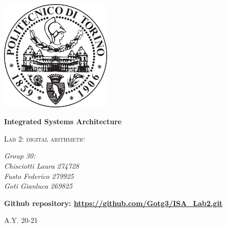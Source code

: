 \documentclass[a4paper, titlepage]{article}
\begin{document}
\begin{titlepage}
	\centering
	\includegraphics[width=0.40\textwidth]{Politecnico_di_Torino_-_Logo}\par\vspace{1cm}
	\vspace{1cm}
	{\huge\bfseries Integrated Systems Architecture\par}
	\vspace{1cm}
	{\scshape\Large Lab 2: digital arithmetic \par}
	\vspace{2,5cm}
	{\Large\itshape Group 30:\\Chisciotti Laura 274728\\Fusto Federico 279925 \\Goti Gianluca 269825\par}
	\vspace{2,5cm}
		{\Large\bfseries Github repository: \url{https://github.com/Gotg3/ISA_Lab2.git}\par}
	\vfill

	\vfill
	{\Large A.Y. 20-21}
\end{titlepage}
\newpage
\tableofcontents
\newpage
\end{document}
